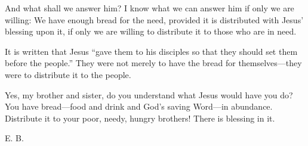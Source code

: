 And what shall we answer him? I know what we can answer him if only we are willing: We have enough bread for the need, provided it is distributed with Jesus’ blessing upon it, if only we are willing to distribute it to those who are in need.

It is written that Jesus “gave them to his disciples so that they should set them before the people.” They were not merely to have the bread for themselves—they were to distribute it to the people.

Yes, my brother and sister, do you understand what Jesus would have you do? You have bread—food and drink and God’s saving Word—in abundance. Distribute it to your poor, needy, hungry brothers! There is blessing in it.

E. B.